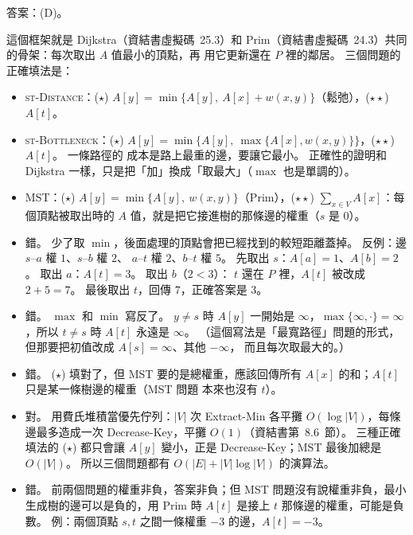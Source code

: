 \begin{pastsoln}
答案：(D)。

這個框架就是 Dijkstra（資結書虛擬碼~25.3）和 Prim（資結書虛擬碼~24.3）共同的骨架：每次取出 $A$ 值最小的頂點，再
用它更新還在 $P$ 裡的鄰居。 三個問題的正確填法是：
\begin{itemize}
\item \textsc{st-Distance}：($\star$) $A[y] = \min\{A[y],\ A[x] + w(x, y)\}$（鬆弛），($\star\star$) $A[t]$。
\item \textsc{st-Bottleneck}：($\star$) $A[y] = \min\{A[y],\ \max\{A[x], w(x, y)\}\}$，($\star\star$) $A[t]$。 一條路徑的
成本是路上最重的邊，要讓它最小。 正確性的證明和 Dijkstra 一樣，只是把「加」換成「取最大」（$\max$ 也是單調的）。
\item MST：($\star$) $A[y] = \min\{A[y],\ w(x, y)\}$（Prim），($\star\star$) $\sum_{x \in V} A[x]$：每個頂點被取出時的
$A$ 值，就是把它接進樹的那條邊的權重（$s$ 是 $0$）。
\end{itemize}

\begin{itemize}
\item[(A)] 錯。 少了取 $\min$，後面處理的頂點會把已經找到的較短距離蓋掉。 反例：邊 $s$--$a$ 權 $1$、$s$--$b$ 權 $2$、
$a$--$t$ 權 $2$、$b$--$t$ 權 $5$。 先取出 $s$：$A[a] = 1$、$A[b] = 2$。 取出 $a$：$A[t] = 3$。 取出 $b$（$2 < 3$）：
$t$ 還在 $P$ 裡，$A[t]$ 被改成 $2 + 5 = 7$。 最後取出 $t$，回傳 $7$，正確答案是 $3$。
\item[(B)] 錯。 $\max$ 和 $\min$ 寫反了。 $y \ne s$ 時 $A[y]$ 一開始是 $\infty$，$\max\{\infty, \cdot\} = \infty$，所以
$t \ne s$ 時 $A[t]$ 永遠是 $\infty$。 （這個寫法是「最寬路徑」問題的形式，但那要把初值改成 $A[s] = \infty$、其他 $-\infty$，
而且每次取最大的。）
\item[(C)] 錯。 ($\star$) 填對了，但 MST 要的是總權重，應該回傳所有 $A[x]$ 的和；$A[t]$ 只是某一條樹邊的權重（MST 問題
本來也沒有 $t$）。
\item[(D)] 對。 用費氏堆積當優先佇列：$|V|$ 次 Extract-Min 各平攤 $O(\log |V|)$，每條邊最多造成一次 Decrease-Key，平攤
$O(1)$（資結書第~8.6~節）。 三種正確填法的 ($\star$) 都只會讓 $A[y]$ 變小，正是 Decrease-Key；MST 最後加總是 $O(|V|)$。
所以三個問題都有 $O(|E| + |V| \log |V|)$ 的演算法。
\item[(E)] 錯。 前兩個問題的權重非負，答案非負；但 MST 問題沒有說權重非負，最小生成樹的邊可以是負的，用 Prim 時
$A[t]$ 是接上 $t$ 那條邊的權重，可能是負數。 例：兩個頂點 $s, t$ 之間一條權重 $-3$ 的邊，$A[t] = -3$。
\end{itemize}
\end{pastsoln}
